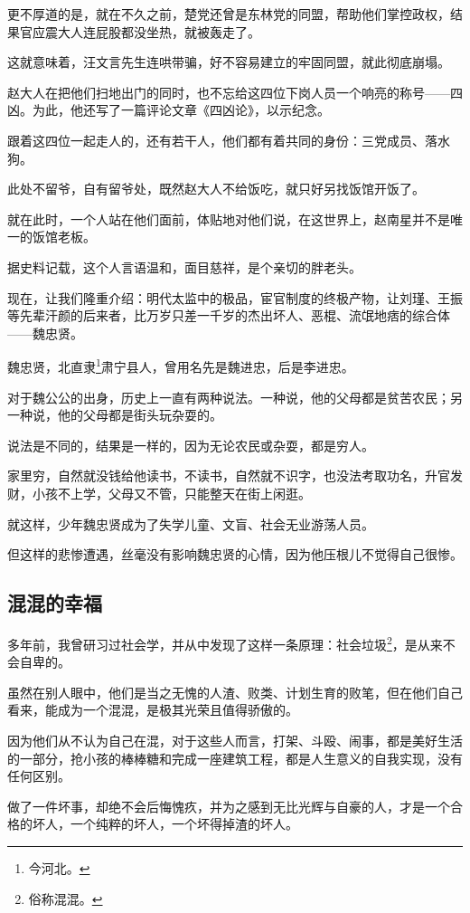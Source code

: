 \begin{multicols}{\theparacolNo}
更不厚道的是，就在不久之前，楚党还曾是东林党的同盟，帮助他们掌控政权，结果官应震大人连屁股都没坐热，就被轰走了。

这就意味着，汪文言先生连哄带骗，好不容易建立的牢固同盟，就此彻底崩塌。

赵大人在把他们扫地出门的同时，也不忘给这四位下岗人员一个响亮的称号——四凶。为此，他还写了一篇评论文章《四凶论》，以示纪念。

跟着这四位一起走人的，还有若干人，他们都有着共同的身份：三党成员、落水狗。

此处不留爷，自有留爷处，既然赵大人不给饭吃，就只好另找饭馆开饭了。

就在此时，一个人站在他们面前，体贴地对他们说，在这世界上，赵南星并不是唯一的饭馆老板。

据史料记载，这个人言语温和，面目慈祥，是个亲切的胖老头。

现在，让我们隆重介绍：明代太监中的极品，宦官制度的终极产物，让刘瑾、王振等先辈汗颜的后来者，比万岁只差一千岁的杰出坏人、恶棍、流氓地痞的综合体——魏忠贤。

魏忠贤，北直隶\footnote{今河北。}肃宁县人，曾用名先是魏进忠，后是李进忠。

对于魏公公的出身，历史上一直有两种说法。一种说，他的父母都是贫苦农民；另一种说，他的父母都是街头玩杂耍的。

说法是不同的，结果是一样的，因为无论农民或杂耍，都是穷人。

家里穷，自然就没钱给他读书，不读书，自然就不识字，也没法考取功名，升官发财，小孩不上学，父母又不管，只能整天在街上闲逛。

就这样，少年魏忠贤成为了失学儿童、文盲、社会无业游荡人员。

但这样的悲惨遭遇，丝毫没有影响魏忠贤的心情，因为他压根儿不觉得自己很惨。

\subsection{混混的幸福}
多年前，我曾研习过社会学，并从中发现了这样一条原理：社会垃圾\footnote{俗称混混。}，是从来不会自卑的。

虽然在别人眼中，他们是当之无愧的人渣、败类、计划生育的败笔，但在他们自己看来，能成为一个混混，是极其光荣且值得骄傲的。

因为他们从不认为自己在混，对于这些人而言，打架、斗殴、闹事，都是美好生活的一部分，抢小孩的棒棒糖和完成一座建筑工程，都是人生意义的自我实现，没有任何区别。

做了一件坏事，却绝不会后悔愧疚，并为之感到无比光辉与自豪的人，才是一个合格的坏人，一个纯粹的坏人，一个坏得掉渣的坏人。


\end{multicols}
